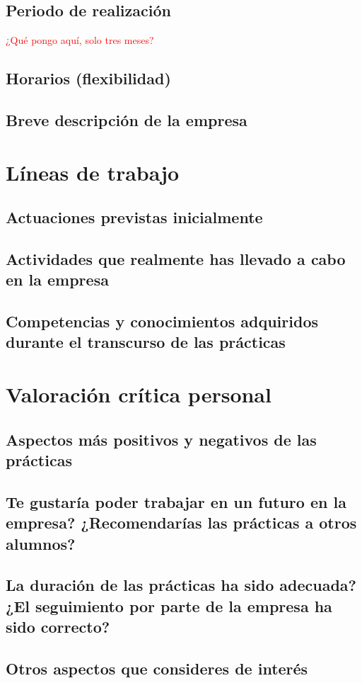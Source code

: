 \documentclass[12pt,letterpaper]{article}
\begin{document}
\subsection{Periodo de realización}
\textcolor{red}{¿Qué pongo aquí, solo tres meses?}

\subsection{Horarios (flexibilidad)}


\subsection{Breve descripción de la empresa}



\section{Líneas de trabajo}
\subsection{Actuaciones previstas inicialmente}

\subsection{Actividades que realmente has llevado a cabo en la empresa}

\subsection{Competencias y conocimientos adquiridos durante el transcurso de las prácticas}


\section{Valoración crítica personal}
\subsection{Aspectos más positivos y negativos de las prácticas}

\subsection{Te gustaría poder trabajar en un futuro en la empresa? ¿Recomendarías las prácticas a otros alumnos?}

\subsection{La duración de las prácticas ha sido adecuada? ¿El seguimiento por parte de la empresa ha sido correcto?}

\subsection{Otros aspectos que consideres de interés}
\end{document}
